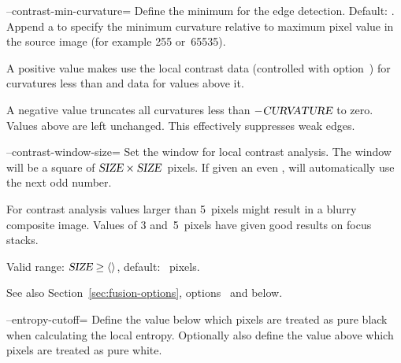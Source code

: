 \begin{codelist}
  \label{opt:contrast-min-curvature}%
\item[--contrast-min-curvature=\metavar{CURVATURE}]\itemend
  Define the minimum  for the  edge
  detection.  Default: .  Append a
  \sample{\%} to specify the minimum curvature relative to maximum
  pixel value in the source image (for example 255 or~65535).

  A positive value makes \App{} use the local contrast data
  (controlled with option~) for
  curvatures less than  and  data for
  values above it.

  A negative value truncates all curvatures less than
  $-\textsl{CURVATURE}$ to zero.  Values above 
  are left unchanged.  This effectively suppresses weak edges.


  \label{opt:contrast-window-size}%
\item[--contrast-window-size=\metavar{SIZE}]\itemend
  Set the window  for local contrast analysis.  The
  window will be a square of $\textsl{SIZE} \times
  \textsl{SIZE}$~pixels.  If given an even , \App{}
  will automatically use the next odd number.

  For contrast analysis  values larger than 5~pixels
  might result in a blurry composite image.  Values of 3 and~5~pixels
  have given good results on focus stacks.

  Valid range: $\metavar{SIZE} \geq
  \val{val:minimum-contrast-window-size}$, default:
  ~pixels.

  See also Section~\ref{sec:fusion-options}, options
  ~and  below.


  \label{opt:entropy-cutoff}%
\item[--entropy-cutoff=\metavar{LOWER-CUTOFF}\optional{:\metavar{UPPER-CUTOFF}}]\itemend
  Define the  value below which pixels are
  treated as pure black when calculating the local entropy.
  Optionally also define the  value above which
  pixels are treated as pure white.


\end{codelist}

